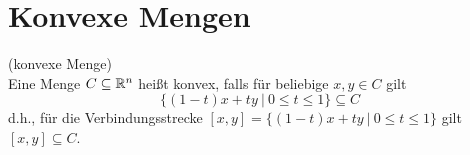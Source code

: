 \section{Konvexe Mengen}

\begin{Definition}(konvexe Menge)\\
	Eine Menge $C\subseteq\mathbb R^n$ hei\ss t konvex, falls f\"ur beliebige $x,y\in C$ gilt
	\begin{equation*}
	\lbrace (1-t)x+ty ~\vert~ 0\leq t \leq 1\rbrace  \subseteq C
	\end{equation*}
	d.h., f\"ur die Verbindungsstrecke $\left[x,y\right]=\{(1-t)x+ty ~\vert~ 0\leq t \leq 1 \}$ gilt $\left[x,y\right]\subseteq C$.
\end{Definition}






